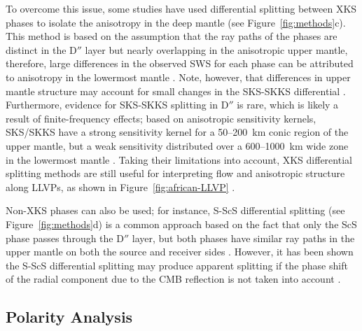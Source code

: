 \documentclass{standard}
\begin{document}
To overcome this issue, some studies have used differential splitting between XKS phases \parencite[e.g., SKS--SKKS;][]{niuSeismicAnisotropyLower2004,vanacoreCharacterizationGalapagosIslands2011,royUpperLowerMantle2014} to  isolate the anisotropy in the deep mantle (see Figure~\ref{fig:methods}c). This method is based on the assumption that the ray paths of the phases are distinct in the D$''$ layer but nearly overlapping in the anisotropic upper mantle, therefore, large differences in the observed SWS for each phase can be attributed to anisotropy in the lowermost mantle \parencite{wolfAdvancesMappingLowermost2024,nowackiNewAdvancesUsing2011,wolfGlobalCompilationDeep2023}. Note, however, that differences in upper mantle structure may account for small changes in the SKS-SKKS differential \parencite{linFullwaveEffectsShear2014}. Furthermore, evidence for SKS-SKKS splitting in D$''$ is rare, which is likely a result of finite-frequency effects; based on anisotropic sensitivity kernels, SKS/SKKS have a strong sensitivity kernel for a 50--200~km conic region of the upper mantle, but a weak sensitivity distributed over a 600--1000~km wide zone in the lowermost mantle \parencite{tommasiDeformationCrystalPreferred2018,sieminskiFiniteFrequencySKSSplitting2008,favierSensitivityKernelsShear2003}. Taking their limitations into account, XKS differential splitting methods are still useful for interpreting flow and anisotropic structure along LLVPs, as shown in Figure~\ref{fig:african-LLVP} \parencite{reissLowermostMantleAnisotropy2019}.

Non-XKS phases can also be used; for instance, S-ScS differential splitting (see Figure~\ref{fig:methods}d) is a common approach based on the fact that only the ScS phase passes through the D$''$ layer, but both phases have similar ray paths in the upper mantle on both the source and receiver sides \parencite{wookeyLowermostMantleAnisotropy2005}. However, it has been shown the S-ScS differential splitting may produce apparent splitting if the phase shift of the radial component due to the CMB reflection is not taken into account \parencite{wolfConstrainingDeepMantle2022}.

\subsection{Polarity Analysis}

\end{document}
